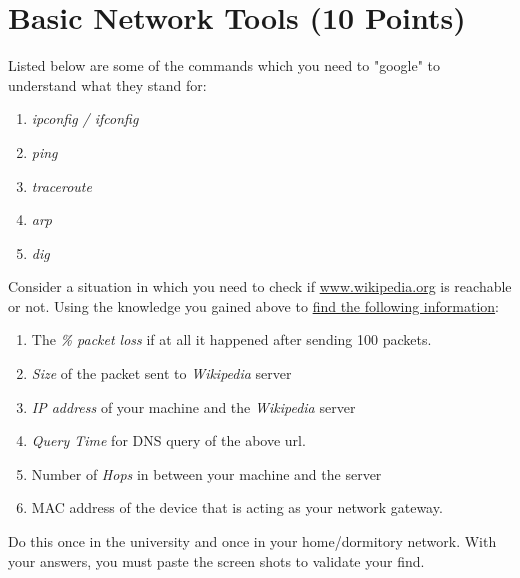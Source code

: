 \documentclass{WeSTassignment}
\begin{document}


\section{Basic Network Tools (10 Points)}

Listed below are some of the commands which you need to "google" to understand what they stand for:
\begin{enumerate}
\item \emph{ipconfig / ifconfig}
\item \emph{ping}
\item \emph{traceroute}
\item \emph{arp}
\item \emph{dig}
\end{enumerate}

Consider a situation in which you need to check if \url{www.wikipedia.org} is reachable or not. Using the knowledge you gained above to \underline{find the following information}:
\begin{enumerate}
\itemsep0em
\item The \emph{\% packet loss} if at all it happened after sending 100 packets. 
\item \emph{Size} of the packet sent to \emph{Wikipedia} server
\item \emph{IP address} of your machine and the \emph{Wikipedia} server
\item \emph{Query Time} for DNS query of the above url.
\item Number of \emph{Hops} in between your machine and the server
\item MAC address of the device that is acting as your network gateway. 
\end{enumerate}

Do this once in the university and once in your home/dormitory network. With your answers, you must paste the screen shots to validate your find.\\
\end{document}
